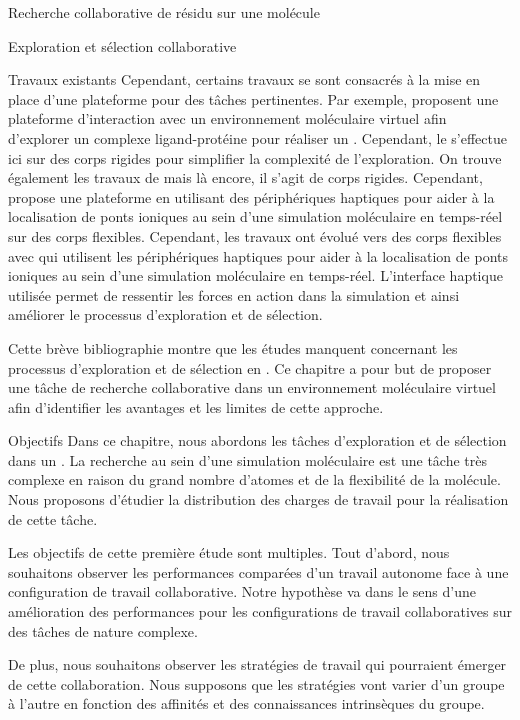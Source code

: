 \documentclass[myfrancais,ngerman,english,french]{mythesis}
\begin{document}
\begin{mychapter}{Recherche collaborative de résidu sur une molécule}
\begin{mysection}{Exploration et sélection collaborative}
\begin{mysubsection}{Travaux existants}
				Cependant, certains travaux se sont consacrés à la mise en place d'une plateforme pour des tâches pertinentes.
				Par exemple,  proposent une plateforme d'interaction avec un environnement moléculaire virtuel afin d'explorer un complexe ligand-protéine pour réaliser un .
				Cependant, le  s'effectue ici sur des corps rigides pour simplifier la complexité de l'exploration.
				On trouve également les travaux de  mais là encore, il s'agit de corps rigides.
				Cependant,  propose une plateforme en utilisant des périphériques haptiques pour aider à la localisation de ponts ioniques au sein d'une simulation moléculaire en temps-réel sur des corps flexibles.
				Cependant, les travaux ont évolué vers des corps flexibles avec  qui utilisent les périphériques haptiques pour aider à la localisation de ponts ioniques au sein d'une simulation moléculaire en temps-réel.
				L'interface haptique utilisée permet de ressentir les forces en action dans la simulation et ainsi améliorer le processus d'exploration et de sélection.

				Cette brève bibliographie montre que les études manquent concernant les processus d'exploration et de sélection en .
				Ce chapitre a pour but de proposer une tâche de recherche collaborative dans un environnement moléculaire virtuel afin d'identifier les avantages et les limites de cette approche.
			\end{mysubsection}
			\begin{mysubsection}{Objectifs}
				Dans ce chapitre, nous abordons les tâches d'exploration et de sélection dans un .
				La recherche au sein d'une simulation moléculaire est une tâche très complexe en raison du grand nombre d'atomes et de la flexibilité de la molécule.
				Nous proposons d'étudier la distribution des charges de travail pour la réalisation de cette tâche.

				Les objectifs de cette première étude sont multiples.
				Tout d'abord, nous souhaitons observer les performances comparées d'un travail autonome face à une configuration de travail collaborative.
				Notre hypothèse va dans le sens d'une amélioration des performances pour les configurations de travail collaboratives sur des tâches de nature complexe.

				De plus, nous souhaitons observer les stratégies de travail qui pourraient émerger de cette collaboration.
				Nous supposons que les stratégies vont varier d'un groupe à l'autre en fonction des affinités et des connaissances intrinsèques du groupe.


\end{mysubsection}
\end{mysection}
\end{mychapter}
\end{document}
